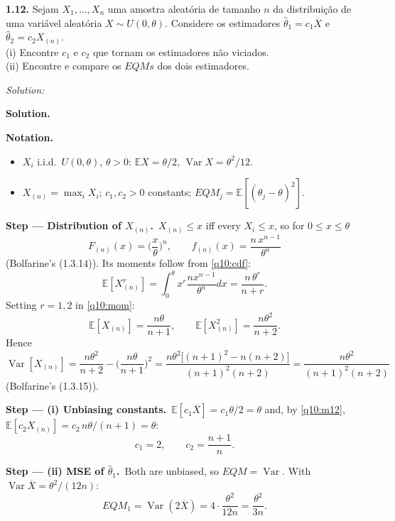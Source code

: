 \documentclass[11pt,a4paper]{article}
\newif\ifsolucoes
\newcommand{\espacoresol}{4.5cm}   %
\numberwithin{equation}{questao}   %
\newenvironment{notacao}{\par\smallskip\noindent\textbf{Notation.}\begin{itemize}[leftmargin=1.4em,topsep=1pt,itemsep=0pt]\small}{\end{itemize}}
\newcommand{\resolespaco}{\ifsolucoes\else\par\textit{Solution:}\vspace{\espacoresol}\par\fi}
\newcommand{\passo}[2]{\par\smallskip\noindent\textbf{Step --- #1.}~#2}
\newcommand{\solhead}{\par\medskip\noindent{\color{blue!55!black}\rule{\linewidth}{0.3pt}}\par\noindent\textbf{Solution.}}
\newcommand{\E}{\mathbb{E}}
\newcommand{\Var}{\operatorname{Var}}
\begin{document}
\begin{otherlanguage}{brazil}
\textbf{1.12.} Sejam $X_1,\dots,X_n$ uma amostra aleatória de tamanho $n$ da distribuição de uma
variável aleatória $X\sim U(0,\theta)$. Considere os estimadores $\hat\theta_1=c_1\overline X$ e
$\hat\theta_2=c_2X_{(n)}$.\\
(i) Encontre $c_1$ e $c_2$ que tornam os estimadores não viciados.\\
(ii) Encontre e compare os $EQMs$ dos dois estimadores.
\end{otherlanguage}
\resolespaco
\begin{sol}
\solhead
\begin{notacao}
\item $X_i$ i.i.d.\ $U(0,\theta)$, $\theta>0$: $\E X=\theta/2$, $\Var X=\theta^2/12$.
\item $X_{(n)}=\max_iX_i$; $c_1,c_2>0$ constants; $EQM_j=\E[(\hat\theta_j-\theta)^2]$.
\end{notacao}

\passo{Distribution of $X_{(n)}$}{$X_{(n)}\le x$ iff every $X_i\le x$, so for $0\le x\le\theta$}
\begin{equation}\label{q10:cdf}
F_{(n)}(x)=\Big(\frac x\theta\Big)^n,\qquad f_{(n)}(x)=\frac{n\,x^{n-1}}{\theta^n}
\end{equation}
(Bolfarine's (1.3.14)). Its moments follow from \eqref{q10:cdf}:
\begin{equation}\label{q10:mom}
\E[X_{(n)}^r]=\int_0^\theta x^r\frac{nx^{n-1}}{\theta^n}dx=\frac{n\,\theta^r}{n+r}.
\end{equation}
Setting $r=1,2$ in \eqref{q10:mom}:
\begin{equation}\label{q10:m12}
\E[X_{(n)}]=\frac{n\theta}{n+1},\qquad \E[X_{(n)}^2]=\frac{n\theta^2}{n+2}.
\end{equation}
Hence
\begin{equation}\label{q10:var}
\Var[X_{(n)}]=\frac{n\theta^2}{n+2}-\Big(\frac{n\theta}{n+1}\Big)^2
=\frac{n\theta^2\big[(n+1)^2-n(n+2)\big]}{(n+1)^2(n+2)}=\frac{n\theta^2}{(n+1)^2(n+2)}
\end{equation}
(Bolfarine's (1.3.15)).

\passo{(i) Unbiasing constants}{$\E[c_1\overline X]=c_1\theta/2=\theta$ and, by \eqref{q10:m12},
$\E[c_2X_{(n)}]=c_2\,n\theta/(n+1)=\theta$:}
\begin{equation}\label{q10:c}
c_1=2,\qquad c_2=\frac{n+1}{n}.
\end{equation}

\passo{(ii) MSE of $\hat\theta_1$}{Both are unbiased, so $EQM=\Var$. With $\Var\overline X=\theta^2/(12n)$:}
\begin{equation}\label{q10:m1}
EQM_1=\Var(2\overline X)=4\cdot\frac{\theta^2}{12n}=\frac{\theta^2}{3n}.
\end{equation}


\end{sol}
\end{document}
